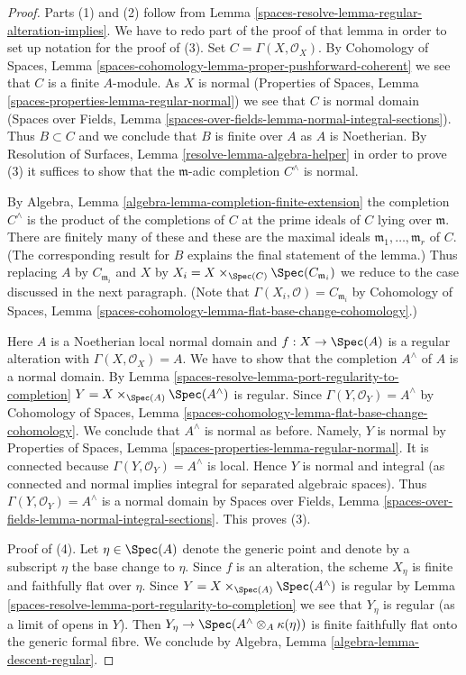 \begin{proof}
Parts (1) and (2) follow from Lemma \ref{spaces-resolve-lemma-regular-alteration-implies}.
We have to redo part of the proof of that lemma in order to set up notation
for the proof of (3). Set $C = \Gamma(X, \mathcal{O}_X)$. By
Cohomology of Spaces, Lemma
\ref{spaces-cohomology-lemma-proper-pushforward-coherent}
we see that $C$ is a finite $A$-module.
As $X$ is normal
(Properties of Spaces, Lemma
\ref{spaces-properties-lemma-regular-normal})
we see that $C$ is normal domain
(Spaces over Fields, Lemma
\ref{spaces-over-fields-lemma-normal-integral-sections}).
Thus $B \subset C$ and we conclude that $B$ is finite over $A$
as $A$ is Noetherian. By
Resolution of Surfaces, Lemma \ref{resolve-lemma-algebra-helper}
in order to prove (3) it suffices to show
that the $\mathfrak m$-adic completion $C^\wedge$ is normal.

\medskip\noindent
By Algebra, Lemma \ref{algebra-lemma-completion-finite-extension}
the completion $C^\wedge$ is the product of the completions of
$C$ at the prime ideals of $C$ lying over $\mathfrak m$.
There are finitely many of these and these are the maximal
ideals $\mathfrak m_1, \ldots, \mathfrak m_r$ of $C$.
(The corresponding result for $B$ explains the final statement of the lemma.)
Thus replacing $A$ by $C_{\mathfrak m_i}$ and $X$ by
$X_i = X \times_{\Spec(C)} \Spec(C_{\mathfrak m_i})$
we reduce to the case discussed in the next paragraph.
(Note that $\Gamma(X_i, \mathcal{O}) = C_{\mathfrak m_i}$ by
Cohomology of Spaces,
Lemma \ref{spaces-cohomology-lemma-flat-base-change-cohomology}.)

\medskip\noindent
Here $A$ is a Noetherian local normal domain and $f : X \to \Spec(A)$
is a regular alteration with $\Gamma(X, \mathcal{O}_X) = A$.
We have to show that the completion $A^\wedge$
of $A$ is a normal domain. By
Lemma \ref{spaces-resolve-lemma-port-regularity-to-completion}
$Y = X \times_{\Spec(A)} \Spec(A^\wedge)$ is regular.
Since $\Gamma(Y, \mathcal{O}_Y) = A^\wedge$
by Cohomology of Spaces,
Lemma \ref{spaces-cohomology-lemma-flat-base-change-cohomology}.
We conclude that $A^\wedge$ is normal as before.
Namely, $Y$ is normal by Properties of Spaces, Lemma
\ref{spaces-properties-lemma-regular-normal}.
It is connected because $\Gamma(Y, \mathcal{O}_Y) = A^\wedge$ is local.
Hence $Y$ is normal and integral (as connected and normal
implies integral for separated algebraic spaces). Thus
$\Gamma(Y, \mathcal{O}_Y) = A^\wedge$ is a normal domain by
Spaces over Fields, Lemma
\ref{spaces-over-fields-lemma-normal-integral-sections}.
This proves (3).

\medskip\noindent
Proof of (4). Let $\eta \in \Spec(A)$ denote the generic point
and denote by a subscript $\eta$ the base change to $\eta$.
Since $f$ is an alteration, the scheme $X_\eta$ is finite and
faithfully flat over $\eta$. Since $Y = X \times_{\Spec(A)} \Spec(A^\wedge)$
is regular by Lemma \ref{spaces-resolve-lemma-port-regularity-to-completion}
we see that $Y_\eta$ is regular (as a limit of opens in $Y$).
Then $Y_\eta \to \Spec(A^\wedge \otimes_A \kappa(\eta))$ is finite
faithfully flat onto the generic formal fibre. We conclude by
Algebra, Lemma \ref{algebra-lemma-descent-regular}.
\end{proof}

